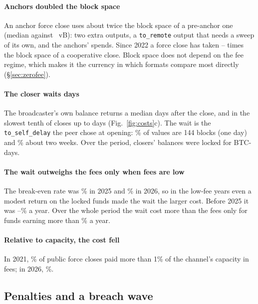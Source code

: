 \paragraph{Anchors doubled the block space}
An anchor force close uses about twice the block space of a pre-anchor one (median \AnchorVbMed{} against
\LegacyVbMed~vB): two extra outputs, a \texttt{to\_remote} output that needs a sweep of its own, and the anchors'
spends. Since 2022 a force close has taken \VbRatioMin--\VbRatioMax{} times the block space of a cooperative close.
Block space does not depend on the fee regime, which makes it the currency in which formats compare most directly
(\S\ref{sec:zerofee}).

\paragraph{The closer waits days}
The broadcaster's own balance returns a median \ToLocalMedDays{} days after the close, and in the slowest tenth of
closes up to \ToLocalPNinetyMax{} days (Fig.~\ref{fig:costs}c). The wait is the \texttt{to\_self\_delay} the peer chose
at opening: \DelayOneDayPct\% of values are 144 blocks (one day) and \DelayTwoWeeksPct\% about two weeks. Over the
period, closers' balances were locked for \BtcDaysLockedAll{} BTC-days.

\paragraph{The wait outweighs the fees only when fees are low}
The break-even rate was \BreakEvenRateTwentyFive\% in 2025 and \BreakEvenRateTwentySix\% in 2026, so in the low-fee
years even a modest return on the locked funds made the wait the larger cost. Before 2025 it was
\BreakEvenRateEarlyMin--\BreakEvenRateEarlyMax\% a year. Over the whole period the wait cost more than the fees only
for funds earning more than \BreakEvenRateAll\% a year.

\paragraph{Relative to capacity, the cost fell}
In 2021, \OverOnePctCapTwentyOne\% of public force closes paid more than 1\% of the channel's capacity in fees; in
2026, \OverOnePctCapTwentySix\%.

\subsection{Penalties and a breach wave}
\label{sec:breach}

